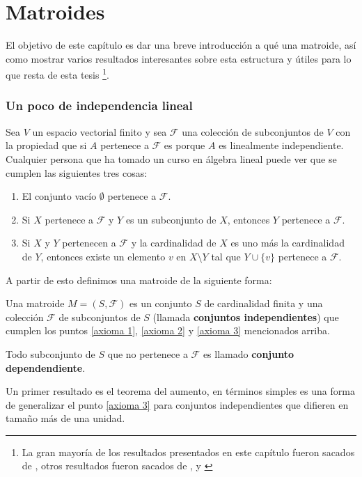 \chapter{Matroides}

El objetivo de este capítulo es dar una breve introducción a qué una matroide, así como mostrar varios resultados interesantes sobre esta estructura y útiles para lo que resta de esta tesis \footnote{La gran mayoría de los resultados presentados en este capítulo fueron sacados de \cite{matroid}, otros resultados fueron sacados de \cite{CO1}, \cite{CO2} y \cite{CO3}}.

\subsection*{Un poco de independencia lineal}
Sea $V$ un espacio vectorial finito y sea $\mathcal{F}$ una colección de subconjuntos de $V$ con la propiedad que si $A$ pertenece a $\mathcal{F}$ es porque $A$ es linealmente independiente. Cualquier persona que ha tomado un curso en álgebra lineal puede ver que se cumplen las siguientes tres cosas: 
\begin{enumerate}
\item El conjunto vacío $\emptyset$ pertenece a $\mathcal{F}$. \label{axioma 1}
\item Si $X$ pertenece a $\mathcal{F}$ y $Y$ es un subconjunto de $X$, entonces $Y$ pertenece a $\mathcal{F}$. \label{axioma 2}
\item Si $X$ y $Y$ pertenecen a $\mathcal{F}$ y la cardinalidad de $X$ es uno más la cardinalidad de $Y$, entonces existe un elemento $v$ en $X \setminus Y$ tal que $Y \cup \{v\} $ pertenece a $\mathcal{F}$. \label{axioma 3}
\end{enumerate}

A partir de esto definimos una matroide de la siguiente forma:
\begin{dfn}
Una matroide $M=(S, \mathcal{F})$ es un conjunto $S$ de cardinalidad finita y una colección $\mathcal{F}$ de subconjuntos de $S$ (llamada \textbf{conjuntos independientes}) que cumplen los puntos \ref{axioma 1}, \ref{axioma 2} y \ref{axioma 3} mencionados arriba. 

Todo subconjunto de $S$ que no pertenece a $\mathcal{F}$ es llamado \textbf{conjunto dependendiente}.
\end{dfn}


Un primer resultado es el teorema del aumento, en términos simples es una forma de generalizar el punto \ref{axioma 3} para conjuntos independientes que difieren en tamaño más de una unidad. 

